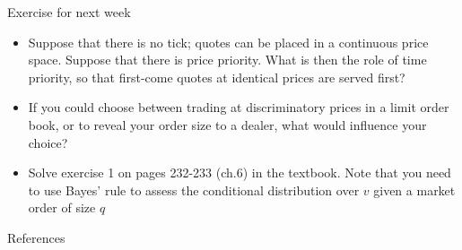 \documentclass[english,10pt
,aspectratio=169
]{beamer}
\begin{document}
\begin{frame}{Exercise for next week}
	\begin{itemize}
		\item Suppose that there is no tick; quotes can  be placed in a continuous price space. Suppose that there is price priority. What is then the role of time priority, so that first-come quotes at identical prices are served first?
		\item If you could choose between trading at discriminatory prices in a limit order book, or to reveal your order size to a dealer, what would influence your choice?
		\item Solve exercise 1 on pages 232-233 (ch.6) in the textbook. Note that you need to use Bayes' rule to assess the conditional distribution over $v$ given a market order of size $q$
	\end{itemize}
\end{frame}





\appendix
\begin{frame}[allowframebreaks]{References}
	
	
\end{frame}
\end{document}
